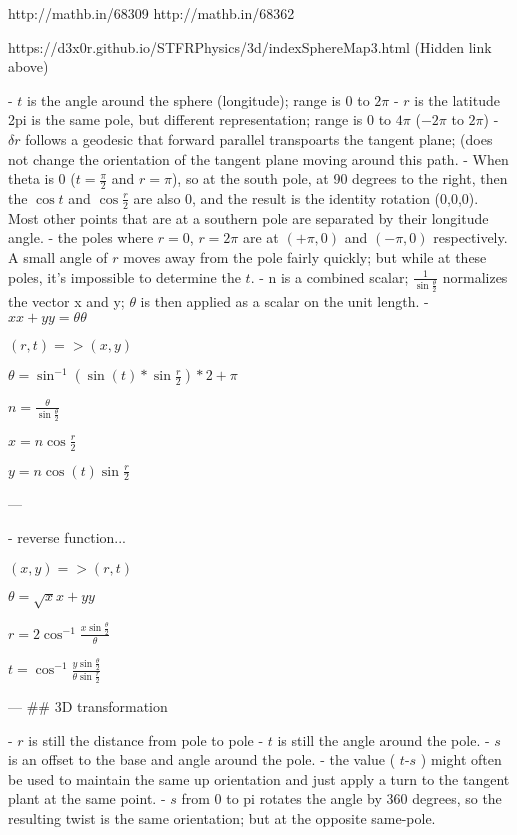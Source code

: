 http://mathb.in/68309
http://mathb.in/68362

https://d3x0r.github.io/STFRPhysics/3d/indexSphereMap3.html
(Hidden link above)




- $t$ is the angle around the sphere (longitude); range is $0$ to $2\pi$ 
- $r$ is the latitude 2pi is the same pole, but different representation; range is $0$ to $4\pi$ ($-2\pi$ to $2\pi$)
- $\delta r$ follows a geodesic that forward parallel transpoarts the tangent plane; (does not change the orientation of the tangent plane moving around this path.
- When theta is 0 ($t=\frac \pi 2$ and $r=\pi$), so at the south pole, at 90 degrees to the right, then the $\cos t$ and $\cos \frac r 2 $ are also 0, and the result is the identity rotation (0,0,0).  Most other points that are at a southern pole are separated by their longitude angle.  
- the poles where $r=0$, $r=2\pi$ are at $(+\pi,0)$ and $(-\pi,0)$  respectively.  A small angle of $r$ moves away from the pole fairly quickly; but while at these poles, it's impossible to determine the $t$.
- n is a combined scalar; $\frac 1 {\sin \frac \theta 2} $ normalizes the vector x and y; $\theta$ is then applied as a scalar on the unit length.
- $xx+yy=\theta\theta$

$ (r,t) => (x,y) $

$\theta = \sin^{-1}( \sin(t)*\sin \frac r 2 )*2 + \pi$

$n = \frac \theta { \sin \frac \theta 2 }$ 

$ x = n \cos \frac r 2 $

$ y = n \cos(t)   \sin {\frac r 2}$
			
---

- reverse function... 

$ (x,y)=> (r,t)$

$ \theta = \sqrt xx+yy $

$ r = 2 \cos^{-1} {\frac {x \sin \frac \theta 2  } \theta  }$

$ t = \cos ^{-1} {\frac { y \sin {\frac \theta 2} } {\theta \sin {\frac r 2 } } }$

---
## 3D transformation

- $r$ is still the distance from pole to pole
- $t$ is still the angle around the pole.
- $s$ is an offset to the base and angle around the pole.
- the value ( $t$-$s$ ) might often be used to maintain the same up orientation and just apply a turn to the tangent plant at the same point.
- $s$ from 0 to pi rotates the angle by 360 degrees, so the resulting twist is the same orientation; but at the opposite same-pole.

